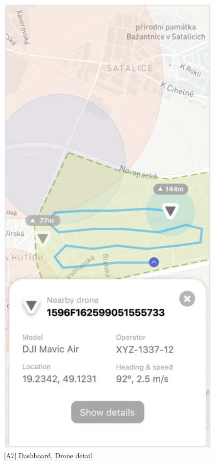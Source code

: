 \begin{figure}
    \centering
    \begin{minipage}{.45\textwidth}
        \centering
        \includegraphics[width=.7\linewidth]{assets/user_interface_design/dashboard/dashboard_drone_detail.png}
        \caption{[A7] Dashboard, Drone detail}
        \label{fig:dashboard_drone_detail}
    \end{minipage}%
    \hspace{.05\linewidth}
    \begin{minipage}{.45\textwidth}
        \centering

\end{minipage}
\end{figure}
